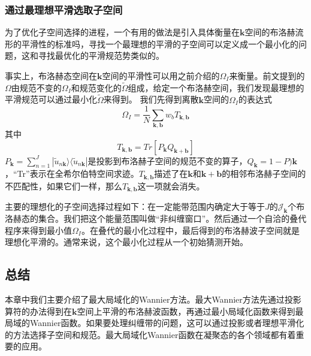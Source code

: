 \subsubsection{通过最理想平滑选取子空间}
为了优化子空间选择的进程，一个有用的做法是引入具体衡量在$\bm{k}$空间的布洛赫流形的平滑性的标准吗，寻找一个最理想的平滑的子空间可以定义成一个最小化的问题，这和寻找最优化的平滑规范势类似的。

事实上，布洛赫态空间在$\bm{k}$空间的平滑性可以用之前介绍的$\Omega_I$来衡量。前文提到的$\Omega$由规范不变的$\Omega_I$和规范变化的$\widetilde \Omega$组成，给定一个布洛赫空间，我们发现最理想的平滑规范可以通过最小化$\widetilde \Omega$来得到。
我们先得到离散$\bm{k}$空间的$\Omega_I$的表达式
\begin{equation}
\Omega_I=\frac{1}{N}\sum_{\bm{k},\bm{b}}w_bT_{\bm{k},\bm{b}}
\end{equation}
其中
\begin{equation}
T_{\bm{k},\bm{b}}=Tr[P_{\bm{k}}Q_{\bm{k+b}}]
\end{equation}
$P_{\bm{k}}=\sum_{n=1}^{J}|\widetilde u_{n \bm{k}}\rangle \langle\widetilde u_{n \bm{k}}|$是投影到布洛赫子空间的规范不变的算子，$Q_{\bm{k}}=1-P){\bm{k}}$，“Tr”表示在全希尔伯特空间求迹。$T_{\bm{k},\bm{b}}$描述了在$\bm{k}$和$\bm{k+b}$的相邻布洛赫子空间的不匹配性，如果它们一样，那么$T_{\bm{k},\bm{b}}$这一项就会消失。

主要的理想化的子空间选择过程如下：在一定能带范围内确定大于等于$J$的$\mathcal{J}_{\bm{k}}$个布洛赫态的集合。我们把这个能量范围叫做“非纠缠窗口”。然后通过一个自洽的叠代程序来得到最小值$\Omega_I$。在叠代的最小化过程中，最后得到的布洛赫波子空间就是理想化平滑的。通常来说，这个最小化过程从一个初始猜测开始。

\subsection{总结}
本章中我们主要介绍了最大局域化的Wannier方法。最大Wannier方法先通过投影算符的办法得到在$\bm{k}$空间上平滑的布洛赫波函数，再通过最小局域化函数来得到最局域的Wannier函数。如果要处理纠缠带的问题，这可以通过投影或者理想平滑化的方法选择子空间和规范。最大局域化Wannier函数在凝聚态的各个领域都有着重要的应用。